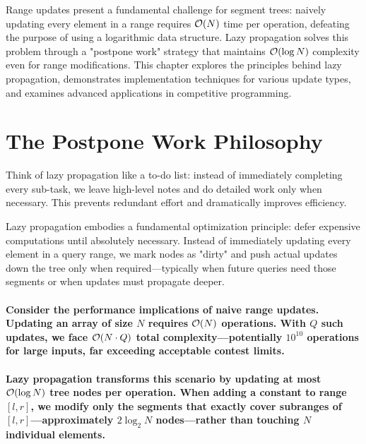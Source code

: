 \label{chap:lazy_propagation}
Range updates present a fundamental challenge for segment trees: naively updating every element in a range requires $\mathcal{O}(N)$ time per operation, defeating the purpose of using a logarithmic data structure. Lazy propagation solves this problem through a "postpone work" strategy that maintains $\mathcal{O}(\log N)$ complexity even for range modifications.
This chapter explores the principles behind lazy propagation, demonstrates implementation techniques for various update types, and examines advanced applications in competitive programming.
\section{The Postpone Work Philosophy}
\label{sec:postpone_work_intuition}
\begin{marginnoteenv}
Think of lazy propagation like a to-do list: instead of immediately completing every sub-task, we leave high-level notes and do detailed work only when necessary. This prevents redundant effort and dramatically improves efficiency.
\end{marginnoteenv}
Lazy propagation embodies a fundamental optimization principle: defer expensive computations until absolutely necessary. Instead of immediately updating every element in a query range, we mark nodes as "dirty" and push actual updates down the tree only when required—typically when future queries need those segments or when updates must propagate deeper.


\paragraph{Consider the performance implications of naive range updates. Updating an array of size $N$ requires $\mathcal{O}(N)$ operations. With $Q$ such updates, we face $\mathcal{O}(N \cdot Q)$ total complexity—potentially $10^{10}$ operations for large inputs, far exceeding acceptable contest limits.}
\paragraph{Lazy propagation transforms this scenario by updating at most $\mathcal{O}(\log N)$ tree nodes per operation. When adding a constant to range $[l,r]$, we modify only the segments that exactly cover subranges of $[l,r]$—approximately $2 \log_2 N$ nodes—rather than touching $N$ individual elements.}
